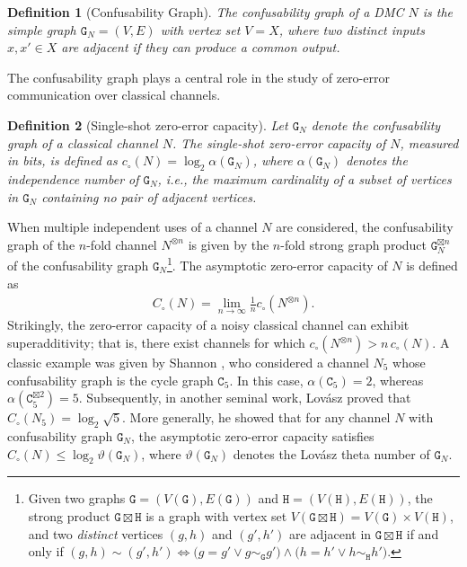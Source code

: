 \documentclass[12pt,a4paper]{article}
\newtheorem{definition}{Definition}
\begin{document}
\begin{definition}[Confusability Graph]\label{def2}
The confusability graph of a DMC $N$ is the simple graph $\mathtt{G}_N=(V,E)$ with vertex set $V=X$, where two distinct inputs $x,x'\in X$ are adjacent if they can produce a common output. 
\end{definition}
\noindent The confusability graph plays a central role in the study of zero-error communication over classical channels.
\begin{definition}[Single-shot zero-error capacity]\label{def3}
Let $\mathtt{G}_N$ denote the confusability graph of a classical channel $N$. The \emph{single-shot zero-error capacity} of $N$, measured in bits, is defined as $c_\circ(N)=\log_2 \alpha(\mathtt{G}_N)$, where $\alpha(\mathtt{G}_N)$ denotes the independence number of $\mathtt{G}_N$, i.e., the maximum cardinality of a subset of vertices in $\mathtt{G}_N$ containing no pair of adjacent vertices.
\end{definition}
\noindent When multiple independent uses of a channel $N$ are considered, the confusability graph of the $n$-fold channel $N^{\otimes n}$ is given by the $n$-fold strong graph product $\mathtt{G}_N^{\boxtimes n}$ of the confusability graph $\mathtt{G}_N$\footnote{Given two graphs $\mathtt{G} = (V(\mathtt{G}), E(\mathtt{G}))$ and $\mathtt{H} = (V(\mathtt{H}), E(\mathtt{H}))$, the strong product $\mathtt{G} \boxtimes \mathtt{H}$ is a graph with vertex set $V(\mathtt{G} \boxtimes \mathtt{H}) = V(\mathtt{G}) \times V(\mathtt{H})$, and two \textit{distinct} vertices $(g, h)$ and $(g', h')$ are adjacent in $\mathtt{G} \boxtimes \mathtt{H}$ if and only if $(g,h) \sim (g',h')\iff\big(g = g' \vee g \sim_{\mathtt{G}} g'\big) \wedge \big(h = h' \vee h \sim_{\mathtt{H}} h'\big)$.}. The asymptotic zero-error capacity of $N$ is defined as
\begin{align}
C_\circ(N)=\lim_{n\to\infty}\frac{1}{n}c_\circ\!\left(N^{\otimes n}\right).   
\end{align}
\noindent Strikingly, the zero-error capacity of a noisy classical channel can exhibit superadditivity; that is, there exist channels for which $c_\circ(N^{\otimes n}) > n\,c_\circ(N)$. A classic example was given by Shannon \cite{Shannon1956}, who considered a channel $N_5$ whose confusability graph is the cycle graph $\mathtt{C}_5$. In this case, $\alpha(\mathtt{C}_5)=2$, whereas $ \alpha(\mathtt{C}_5^{\boxtimes 2})=5$. Subsequently, in another seminal work, Lovász \cite{Lovasz1979} proved that $ C_\circ(N_5)=\log_2 \sqrt{5}$. More generally, he showed that for any channel $N$ with confusability graph $\mathtt{G}_N$, the asymptotic zero-error capacity satisfies $C_\circ(N)\le \log_2 \vartheta(\mathtt{G}_N)$, where $\vartheta(\mathtt{G}_N)$ denotes the Lovász theta number of $\mathtt{G}_N$.
\end{document}
